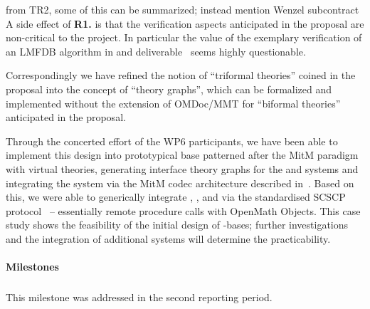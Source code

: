 \begin{oldpart}{from TR2, some of this can be summarized; instead mention Wenzel subcontract}
A side effect of \textbf{R1.} is that the verification aspects anticipated in the proposal are non-critical to the \pn project.
In particular the value of the exemplary verification of an LMFDB algorithm in  and deliverable~ seems highly questionable.

Correspondingly we have refined the notion of ``triformal theories'' coined in the proposal into the concept of ``\DKS theory graphs'', which can be formalized and implemented without the extension of OMDoc/MMT for ``biformal theories'' anticipated in the proposal.

Through the concerted effort of the WP6 participants, we have been able to implement this design into prototypical \DKS base patterned after the MitM paradigm with virtual theories, generating interface theory graphs for the \GAP and \Sage systems and integrating the \LMFDB system via the MitM codec architecture described in~\cite{ODK-D6.2}.
Based on this, we were able to generically integrate \GAP, \Sage, and \LMFDB via the standardised SCSCP protocol~\cite{HorRoz:ossp09} -- essentially remote procedure calls with OpenMath Objects.
This case study shows the feasibility of the initial design of \DKS-bases; further investigations and the integration of additional systems will determine the practicability.
\end{oldpart}

\paragraph{Milestones}

\subparagraph{}
This milestone was addressed in the second reporting period.
\medskip
%

